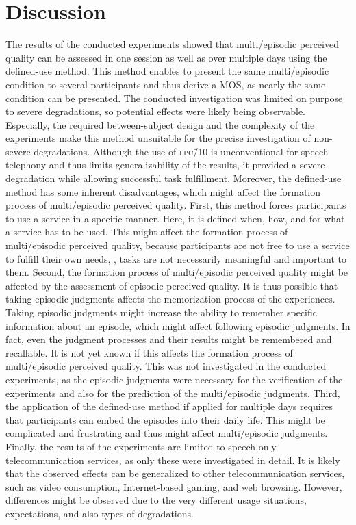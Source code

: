 \section{Discussion}
The results of the conducted experiments showed that multi\-/episodic perceived quality can be assessed in one session as well as over multiple days using the defined-use method.
This method enables to present the same multi\-/episodic condition to several participants and thus derive a \ac{MOS}, as nearly the same condition can be presented.
The conducted investigation was limited on purpose to severe degradations, so potential effects were likely being observable.
Especially, the required between-subject design and the complexity of the experiments make this method unsuitable for the precise investigation of non-severe degradations.
Although the use of \textsc{\lowercase{LPC\=/10}} is unconventional for speech telephony and thus limits generalizability of the results, it provided a severe degradation while allowing successful task fulfillment.
Moreover, the defined-use method has some inherent disadvantages, which might affect the formation process of multi\-/episodic perceived quality.
First, this method forces participants to use a service in a specific manner.
Here, it is defined when, how, and for what a service has to be used.
This might affect the formation process of  multi\-/episodic perceived quality, because participants are not free to use a service to fulfill their own needs, \ie, tasks are not necessarily meaningful and important to them.
Second, the formation process of multi\-/episodic perceived quality might be affected by the assessment of episodic perceived quality.
It is thus possible that taking episodic judgments affects the memorization process of the experiences.
Taking episodic judgments might increase the ability to remember specific information about an episode, which might affect following episodic judgments.
In fact, even the judgment processes and their results might be remembered and recallable.
It is not yet known if this affects the formation process of multi\-/episodic perceived quality.
This was not investigated in the conducted experiments, as the episodic judgments were necessary for the verification of the experiments and also for the prediction of the multi\-/episodic judgments.
Third, the application of the defined-use method if applied for multiple days requires that participants can embed the episodes into their daily life.
This might be complicated and frustrating and thus might affect multi\-/episodic judgments.
Finally, the results of the experiments are limited to speech-only telecommunication services, as only these were investigated in detail.
It is likely that the observed effects can be generalized to other telecommunication services, such as video consumption, Internet-based gaming, and web browsing.
However, differences might be observed due to the very different usage situations, expectations, and also types of degradations.

